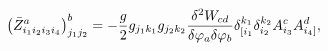 \begin{equation}
\left( \bar{Z}_{i_{1}i_{2}i_{3}i_{4}}^{a}\right) _{j_{1}j_{2}}^{b}=-\frac{g}{%
2}g_{j_{1}k_{1}}g_{j_{2}k_{2}}\frac{\delta ^{2}W_{cd}}{\delta \varphi
_{a}\delta \varphi _{b}}\delta _{[i_{1}}^{k_{1}}\delta
_{i_{2}}^{k_{2}}A_{i_{3}}^{c}A_{i_{4}]}^{d},  \label{i20}
\end{equation}


